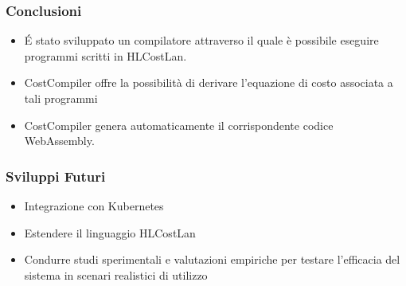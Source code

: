 \documentclass[xcolor=dvipsnames]{beamer}
\begin{document}
\begin{frame}
    \frametitle{Conclusioni}
    \begin{itemize}
        \item É stato sviluppato un \alert{compilatore} attraverso il quale è possibile eseguire programmi scritti in HLCostLan.
        \item CostCompiler offre la possibilità di derivare \alert{l'equazione di costo} associata a tali programmi
        \item CostCompiler genera automaticamente il corrispondente codice \alert{WebAssembly}.
    \end{itemize}
\end{frame}

\begin{frame}
    \frametitle{Sviluppi Futuri}
    \begin{itemize}
        \item Integrazione con Kubernetes
        \item Estendere il linguaggio HLCostLan
        \item Condurre studi sperimentali e valutazioni empiriche per testare l'efficacia del sistema in scenari realistici di utilizzo
    \end{itemize}
    

\end{frame}
\end{document}
